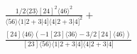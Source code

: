 \documentclass[varwidth, border=5pt]{standalone}
\begin{document}
\begin{my}
$\begin{gathered}
\scriptscriptstyle\frac{1/2⟨23⟩[24]^2⟨46⟩^2}{⟨56⟩⟨1|2+3|4]⟨4|2+3|4]^2}+\\
\scriptscriptstyle\frac{[24]⟨46⟩\scriptscriptstyle(-1[23]⟨36⟩-3/2[24]⟨46⟩)}{[23]⟨56⟩⟨1|2+3|4]⟨4|2+3|4]}\phantom{+}
\end{gathered}$
\end{my}
\end{document}
